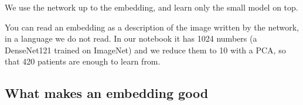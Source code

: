 \documentclass[11pt,a4paper]{article}
\begin{document}
\begin{center}

{\small We use the network up to the embedding, and learn only the small model on top.}
\end{center}

You can read an embedding as a description of the image written by the network, in a language we do not read.
In our notebook it has 1024 numbers (a DenseNet121 trained on ImageNet) and we reduce them to 10 with a PCA, so
that 420 patients are enough to learn from.

\subsection{What makes an embedding good}
\end{document}
